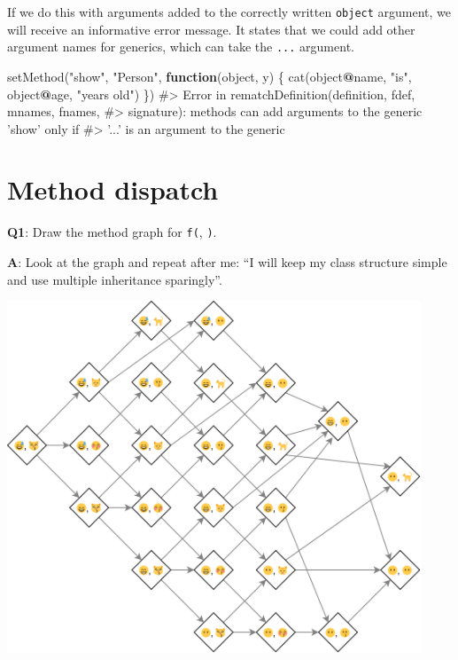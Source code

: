 \documentclass[
]{krantz}
\makeatletter
\newenvironment{Shaded}{\begin{snugshade}}{\end{snugshade}}
\newcommand{\CommentTok}[1]{\textcolor[rgb]{0.56,0.35,0.01}{\textit{#1}}}
\newcommand{\ControlFlowTok}[1]{\textcolor[rgb]{0.13,0.29,0.53}{\textbf{#1}}}
\newcommand{\KeywordTok}[1]{\textcolor[rgb]{0.13,0.29,0.53}{\textbf{#1}}}
\newcommand{\NormalTok}[1]{#1}
\newcommand{\OperatorTok}[1]{\textcolor[rgb]{0.81,0.36,0.00}{\textbf{#1}}}
\newcommand{\StringTok}[1]{\textcolor[rgb]{0.31,0.60,0.02}{#1}}
\newenvironment{kframe}{%
\medskip{}
\setlength{\fboxsep}{.8em}
 \def\at@end@of@kframe{}%
 \ifinner\ifhmode%
  \def\at@end@of@kframe{\end{minipage}}%
  \begin{minipage}{\columnwidth}%
 \fi\fi%
 \def\FrameCommand##1{\hskip\@totalleftmargin \hskip-\fboxsep
 \colorbox{shadecolor}{##1}\hskip-\fboxsep
     \hskip-\linewidth \hskip-\@totalleftmargin \hskip\columnwidth}%
 \MakeFramed {\advance\hsize-\width
   \@totalleftmargin\z@ \linewidth\hsize
   \@setminipage}}%
 {\par\unskip\endMakeFramed%
 \at@end@of@kframe}
\renewenvironment{Shaded}{\begin{kframe}}{\end{kframe}}
\renewcommand{\KeywordTok} [1]{\textcolor[rgb]{0.00,0.44,0.13}{{#1}}}
\renewcommand{\StringTok}  [1]{\textcolor[rgb]{0.25,0.44,0.63}{{#1}}}
\renewcommand{\CommentTok} [1]{\textcolor[rgb]{0.38,0.63,0.69}{{#1}}}
\renewcommand{\NormalTok}  [1]{{#1}}
\makeatother
\begin{document}
If we do this with arguments added to the correctly written \texttt{object} argument, we will receive an informative error message. It states that we could add other argument names for generics, which can take the \texttt{...} argument.

\begin{Shaded}
\begin{Highlighting}[]
\KeywordTok{setMethod}\NormalTok{(}\StringTok{"show"}\NormalTok{, }\StringTok{"Person"}\NormalTok{, }\ControlFlowTok{function}\NormalTok{(object, y) \{}
  \KeywordTok{cat}\NormalTok{(object}\OperatorTok{@}\NormalTok{name, }\StringTok{"is"}\NormalTok{, object}\OperatorTok{@}\NormalTok{age, }\StringTok{"years old"}\NormalTok{)}
\NormalTok{\})}
\CommentTok{#> Error in rematchDefinition(definition, fdef, mnames, fnames,}
\CommentTok{#> signature): methods can add arguments to the generic 'show' only if}
\CommentTok{#> '...' is an argument to the generic}
\end{Highlighting}
\end{Shaded}

\hypertarget{method-dispatch}{%
\section{Method dispatch}\label{method-dispatch}}

\textbf{{Q1}}: Draw the method graph for \texttt{f(}, \texttt{)}.

\textbf{{A}}: Look at the graph and repeat after me: ``I will keep my class structure simple and use multiple inheritance sparingly''.

\begin{center}\includegraphics[width=350pt]{images/s4/method_dispatch1} \end{center}
\end{document}
